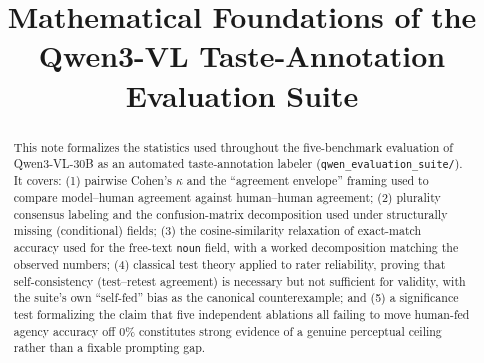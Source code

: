 \documentclass[11pt]{article}
\title{Mathematical Foundations of the Qwen3-VL Taste-Annotation\\Evaluation Suite}
\author{}
\date{}
\begin{document}
\maketitle

\begin{abstract}
This note formalizes the statistics used throughout the five-benchmark
evaluation of Qwen3-VL-30B as an automated taste-annotation labeler
(\texttt{qwen\_evaluation\_suite/}). It covers: (1) pairwise Cohen's
$\kappa$ and the ``agreement envelope'' framing used to compare model--human
agreement against human--human agreement; (2) plurality consensus labeling
and the confusion-matrix decomposition used under structurally missing
(conditional) fields; (3) the cosine-similarity relaxation of exact-match
accuracy used for the free-text \texttt{noun} field, with a worked
decomposition matching the observed numbers; (4) classical test theory
applied to rater reliability, proving that self-consistency (test--retest
agreement) is necessary but not sufficient for validity, with the
suite's own ``self-fed'' bias as the canonical counterexample; and (5) a
significance test formalizing the claim that five independent ablations
all failing to move human-fed agency accuracy off $0\%$ constitutes strong
evidence of a genuine perceptual ceiling rather than a fixable prompting
gap.
\end{abstract}

\tableofcontents






\end{document}
